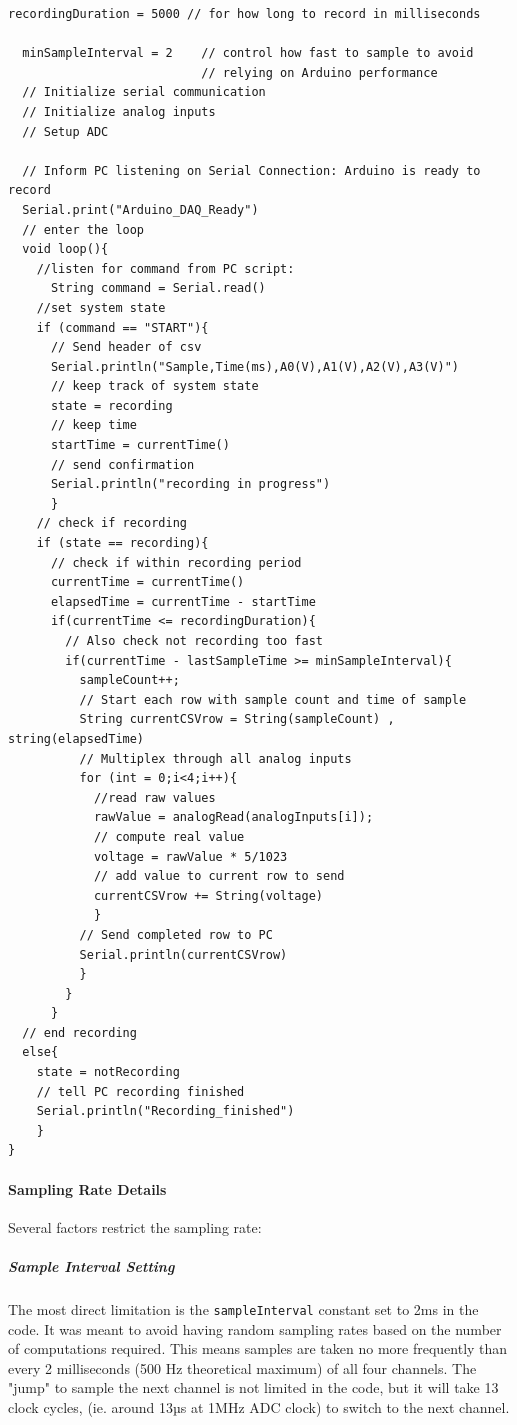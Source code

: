 \begin{lstlisting}[style=cstyle, caption=Arduino DAQ PseudoCode, label=lst:arduinoPseudoCode]
  recordingDuration = 5000 // for how long to record in milliseconds
  
  minSampleInterval = 2    // control how fast to sample to avoid
                           // relying on Arduino performance
  // Initialize serial communication
  // Initialize analog inputs
  // Setup ADC

  // Inform PC listening on Serial Connection: Arduino is ready to record
  Serial.print("Arduino_DAQ_Ready")
  // enter the loop 
  void loop(){
    //listen for command from PC script:
      String command = Serial.read()
    //set system state
    if (command == "START"){
      // Send header of csv
      Serial.println("Sample,Time(ms),A0(V),A1(V),A2(V),A3(V)")
      // keep track of system state
      state = recording
      // keep time
      startTime = currentTime()
      // send confirmation
      Serial.println("recording in progress")
      }
    // check if recording
    if (state == recording){
      // check if within recording period
      currentTime = currentTime()
      elapsedTime = currentTime - startTime
      if(currentTime <= recordingDuration){
        // Also check not recording too fast  
        if(currentTime - lastSampleTime >= minSampleInterval){
          sampleCount++;
          // Start each row with sample count and time of sample
          String currentCSVrow = String(sampleCount) , string(elapsedTime)
          // Multiplex through all analog inputs 
          for (int = 0;i<4;i++){
            //read raw values
            rawValue = analogRead(analogInputs[i]);
            // compute real value
            voltage = rawValue * 5/1023
            // add value to current row to send
            currentCSVrow += String(voltage)
            }
          // Send completed row to PC
          Serial.println(currentCSVrow)
          }
        }
      }
  // end recording
  else{
    state = notRecording
    // tell PC recording finished
    Serial.println("Recording_finished")
    }
}
\end{lstlisting}

\paragraph{Sampling Rate Details}
Several factors restrict the sampling rate:

\subparagraph{Sample Interval Setting}
The most direct limitation is the \texttt{sampleInterval} constant set to 2ms in the code. It was meant to avoid having random sampling rates based on the number of computations required. This means samples are taken no more frequently than every 2 milliseconds (500 Hz theoretical maximum) of all four channels. The "jump" to sample the next channel is not limited in the code, but it will take 13 clock cycles, (ie. around 13µs at 1MHz ADC clock) to switch to the next channel.

